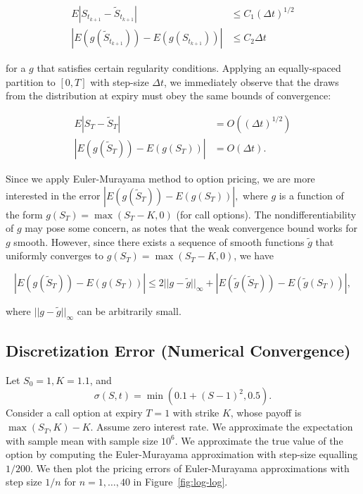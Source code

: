 \documentclass[12pt]{article}
\numberwithin{equation}{section}
\newcommand{\abs}[1]{\left|#1\right|}
\newcommand{\norm}[1]{||#1||}
\newcommand{\pr}[1]{\left(#1\right)}
\begin{document}
\begin{align}
E\abs{S_{t_{k+1}} - \tilde S_{t_{k+1}}} &\le C_1(\Delta t)^{1/2}
\tag{Strong convergence} \\ 
\abs{E(g(\tilde S_{t_{k+1}})) - E (g(S_{t_{k+1}}))} &\le C_2
\Delta t \tag{Weak convergence}
\end{align}

for a $g$ that satisfies certain regularity conditions. 
Applying an equally-spaced partition to $[0,T]$ with step-size $\Delta t$, we
immediately observe that the draws from the distribution at expiry must obey the
same bounds of convergence:

\begin{align*}
E\abs{S_{T} - \tilde S_{T}} &= O\pr{(\Delta t)^{1/2}} \\
\abs{E(g(\tilde S_{{T}})) - E (g(S_{T}))} &= O(\Delta t).
\end{align*}

Since we apply Euler-Murayama method to option pricing, we are more interested
in the error $\abs{E(g(\tilde S_T)) - E(g(S_T))},$ where $g$ is a function of
the form $g(S_T) = \max(S_T - K, 0)$ (for call options). The
nondifferentiability of $g$ may pose some concern, as
\cite{higham2001algorithmic} notes that the weak convergence bound works for $g$
smooth. However, since there exists a sequence of smooth functions $\tilde g$
that uniformly converges to $g(S_T) = \max(S_T - K, 0)$, we have 

\[
\abs{E(g(\tilde S_T)) - E(g(S_T))} \le 2\norm{g-\tilde g}_\infty + \abs{E(\tilde
g(\tilde S_{{T}})) - E (\tilde g(S_{T}))},
\]

where $\norm{g-\tilde g}_\infty$ can be arbitrarily small. 

\subsection{Discretization Error (Numerical Convergence)}

Let $S_0 = 1, K = 1.1$, and \[\sigma(S, t) = \min\pr{0.1 + (S - 1)^2, 0.5}.\]
Consider a call option at expiry $T = 1$ with strike $K$, whose payoff is
$\max(S_T, K) - K$. Assume zero interest rate. We approximate the expectation
with sample mean with sample size $10^6$. We approximate the true value of the
option by computing the Euler-Murayama approximation with step-size equalling
$1/200$. We then plot the pricing errors of Euler-Murayama approximations with
step size $1/n$ for $n=1,\ldots,40$ in Figure~\ref{fig:log-log}. 
\end{document}
